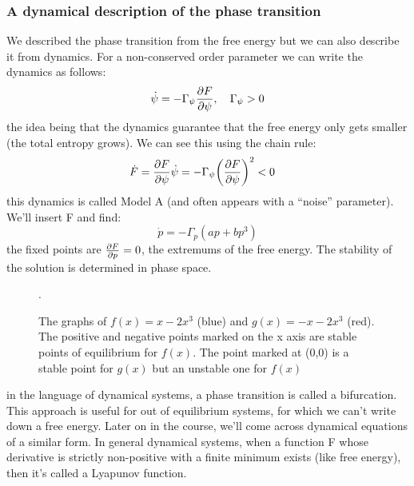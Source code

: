 \subsubsection{A dynamical description of the phase transition}
We described the phase transition from the free energy but we can also describe it from dynamics. For a non-conserved order parameter we can write the dynamics as follows:
\begin{equation}
	\dot\psi=-\Gamma_\psi\diffp{F}{\psi}, \quad \Gamma_\psi>0
\end{equation}
the idea being that the dynamics guarantee that the free energy only gets smaller (the total entropy grows). We can see this using the chain rule:
\begin{align}
	\dot F &= \diffp{F}{\psi}\dot\psi=-\Gamma_\psi{\left(\diffp{F}{\psi}\right)}^2<0
\end{align}
this dynamics is called Model A (and often appears with a ``noise'' parameter). We'll insert F and find:
\begin{equation}
	\dot p = -\Gamma_p(ap+bp^3)
\end{equation}
the fixed points are \(\diffp{F}{p}=0\), the extremums of the free energy. The stability of the solution is determined in phase space.
\begin{figure}[!htb]
	\centering
	\caption{The graphs of \(f(x)=x-2x^3\) (blue) and \(g(x)=-x-2x^3\) (red). The positive and negative points marked on the x axis are stable points of equilibrium for \(f(x)\). The point marked at (0,0) is a stable point for \(g(x)\) but an unstable one for \(f(x)\)}.
\end{figure}
in the language of dynamical systems, a phase transition is called a bifurcation. This approach is useful for out of equilibrium systems, for which we can't write down a free energy. Later on in the course, we'll come across dynamical equations of a similar form.
In general dynamical systems, when a function F whose derivative is strictly non-positive with a finite minimum exists (like free energy), then it's called a Lyapunov function.
